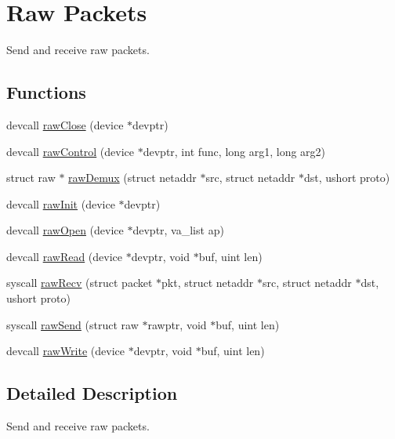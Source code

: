 \hypertarget{group__raw}{\section{Raw Packets}
\label{group__raw}
}


Send and receive raw packets.  


\subsection*{Functions}
\begin{DoxyCompactItemize}
\item 
devcall \hyperlink{group__raw_ga3226cf84ecbe32c7891ef562dd685a13}{raw\-Close} (device $\ast$devptr)
\item 
devcall \hyperlink{group__raw_ga6e1624816fad3a948c3676fdfb4f0b16}{raw\-Control} (device $\ast$devptr, int func, long arg1, long arg2)
\item 
struct raw $\ast$ \hyperlink{group__raw_ga21df9d51e521e20c0d698d6deb92dd1d}{raw\-Demux} (struct netaddr $\ast$src, struct netaddr $\ast$dst, ushort proto)
\item 
devcall \hyperlink{group__raw_ga1e865f42b5835df2606c9baad3559ad1}{raw\-Init} (device $\ast$devptr)
\item 
devcall \hyperlink{group__raw_ga16ca67af60cfea565544cc0ddf5d8d44}{raw\-Open} (device $\ast$devptr, va\-\_\-list ap)
\item 
devcall \hyperlink{group__raw_gafbb17ac395517eee84cdbdc6d74d1d25}{raw\-Read} (device $\ast$devptr, void $\ast$buf, uint len)
\item 
syscall \hyperlink{group__raw_ga382435839d865928482a977c6b2dc3e3}{raw\-Recv} (struct packet $\ast$pkt, struct netaddr $\ast$src, struct netaddr $\ast$dst, ushort proto)
\item 
syscall \hyperlink{group__raw_ga96bcfddfc19de3105a3ad83cf5ec68f7}{raw\-Send} (struct raw $\ast$rawptr, void $\ast$buf, uint len)
\item 
devcall \hyperlink{group__raw_ga5b6e06855a1ac2e31f4c90f2742fc817}{raw\-Write} (device $\ast$devptr, void $\ast$buf, uint len)
\end{DoxyCompactItemize}


\subsection{Detailed Description}
Send and receive raw packets. 

